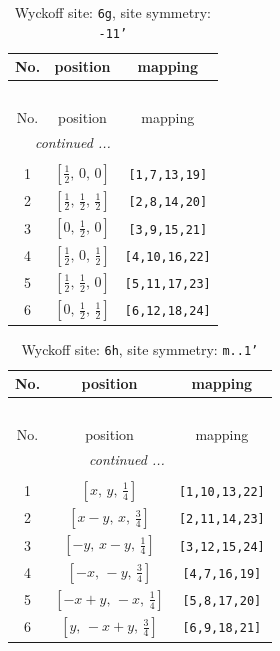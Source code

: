 \documentclass[fleqn,8pt]{jsarticle}
\begin{document}
\renewcommand{\arraystretch}{1.2}
\begin{longtable}{ccc}
\caption{Wyckoff site: {\tt 6g}, site symmetry: {\tt -11'}}
 \\
 \hline \hline
No. & position & mapping \\ \hline \endfirsthead

\multicolumn{2}{l}{\tablename\ \thetable{}} \\
 \hline \hline
No. & position & mapping \\ \hline \endhead

 \hline \hline
\multicolumn{2}{r}{\footnotesize\it continued ...} \\ \endfoot

 \hline \hline
\multicolumn{2}{r}{} \\ \endlastfoot

1 & $\left[ \frac{1}{2},\, 0,\, 0 \right]$ & {\tt [1,7,13,19]} \\ \hline
2 & $\left[ \frac{1}{2},\, \frac{1}{2},\, \frac{1}{2} \right]$ & {\tt [2,8,14,20]} \\ \hline
3 & $\left[ 0,\, \frac{1}{2},\, 0 \right]$ & {\tt [3,9,15,21]} \\ \hline
4 & $\left[ \frac{1}{2},\, 0,\, \frac{1}{2} \right]$ & {\tt [4,10,16,22]} \\ \hline
5 & $\left[ \frac{1}{2},\, \frac{1}{2},\, 0 \right]$ & {\tt [5,11,17,23]} \\ \hline
6 & $\left[ 0,\, \frac{1}{2},\, \frac{1}{2} \right]$ & {\tt [6,12,18,24]} \\
\end{longtable}
\renewcommand{\arraystretch}{1.2}
\begin{longtable}{ccc}
\caption{Wyckoff site: {\tt 6h}, site symmetry: {\tt m..1'}}
 \\
 \hline \hline
No. & position & mapping \\ \hline \endfirsthead

\multicolumn{2}{l}{\tablename\ \thetable{}} \\
 \hline \hline
No. & position & mapping \\ \hline \endhead

 \hline \hline
\multicolumn{2}{r}{\footnotesize\it continued ...} \\ \endfoot

 \hline \hline
\multicolumn{2}{r}{} \\ \endlastfoot

1 & $\left[ x,\, y,\, \frac{1}{4} \right]$ & {\tt [1,10,13,22]} \\ \hline
2 & $\left[ x - y,\, x,\, \frac{3}{4} \right]$ & {\tt [2,11,14,23]} \\ \hline
3 & $\left[ - y,\, x - y,\, \frac{1}{4} \right]$ & {\tt [3,12,15,24]} \\ \hline
4 & $\left[ - x,\, - y,\, \frac{3}{4} \right]$ & {\tt [4,7,16,19]} \\ \hline
5 & $\left[ - x + y,\, - x,\, \frac{1}{4} \right]$ & {\tt [5,8,17,20]} \\ \hline
6 & $\left[ y,\, - x + y,\, \frac{3}{4} \right]$ & {\tt [6,9,18,21]} \\
\end{longtable}
\end{document}
